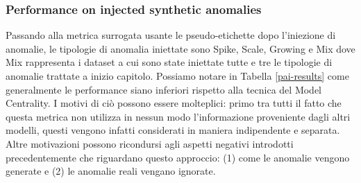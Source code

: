 \newpage
\subsubsection{Performance on injected synthetic anomalies}
Passando alla metrica surrogata usante le pseudo-etichette dopo l'iniezione di anomalie, le tipologie di anomalia iniettate sono Spike, Scale, Growing e Mix dove Mix rappresenta i dataset a cui sono state iniettate tutte e tre le tipologie di anomalie trattate a inizio capitolo. Possiamo notare in Tabella \ref{pai-results} come generalmente le performance siano inferiori rispetto alla tecnica del Model Centrality. I motivi di ciò possono essere molteplici: primo tra tutti il fatto che questa metrica non utilizza in nessun modo l'informazione proveniente dagli altri modelli, questi vengono infatti considerati in maniera indipendente e separata. Altre motivazioni possono ricondursi agli aspetti negativi introdotti precedentemente che riguardano questo approccio: (1) come le anomalie vengono generate e (2) le anomalie reali vengano ignorate.

